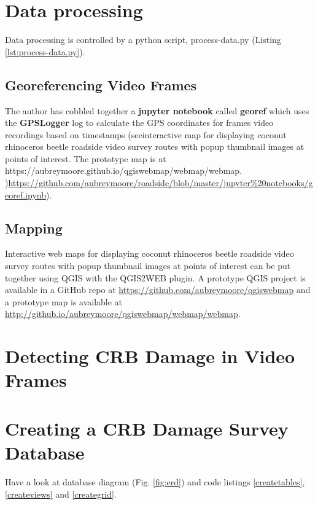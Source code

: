 \documentclass[12pt,letterpaper,english,bibliography=totocnumbered, abstract=on]{scrartcl}
\begin{document}
\section{Data processing}

Data processing is controlled by a python script, process-data.py (Listing \ref{lst:process-data.py}).




\subsection{Georeferencing Video Frames}

The author has cobbled together a \textbf{jupyter notebook} called \textbf{georef} which uses the \textbf{GPSLogger} log to calculate the GPS coordinates for frames video recordings based on timestamps (seeinteractive map for displaying coconut rhinoceros beetle roadside video survey routes with popup thumbnail images at points of interest. The prototype map is at https://aubreymoore.github.io/qgiswebmap/webmap/webmap. )\url{https://github.com/aubreymoore/roadside/blob/master/jupyter%20notebooks/georef.ipynb}). 
	
\subsection{Mapping}

Interactive web maps for displaying coconut rhinoceros beetle roadside video survey routes with popup thumbnail images at points of interest can be put together using QGIS with the QGIS2WEB plugin. A prototype QGIS project is available in a GitHub repo at \url{https://github.com/aubreymoore/qgiswebmap} and a prototype map is available at \url{http://github.io/aubreymoore/qgiswebmap/webmap/webmap}.

\section{Detecting CRB Damage in Video Frames}

\section{Creating a CRB Damage Survey Database}

Have a look at database diagram (Fig. \ref{fig:erd}) and code listings \ref{createtables},  \ref{createviews} and \ref{creategrid}.
\end{document}
